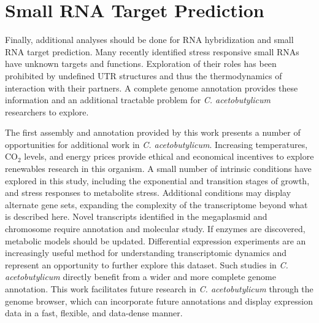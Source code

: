 \section{Small RNA Target Prediction}
Finally, additional analyses should be done for RNA hybridization and small RNA target prediction. Many recently identified stress responsive small RNAs\cite{39} have unknown targets and functions. Exploration of their roles has been prohibited by undefined UTR structures and thus the thermodynamics of interaction with their partners. A complete genome annotation provides these information and an additional tractable problem for \textit{C. acetobutylicum} researchers to explore.

The first assembly and annotation provided by this work presents a number of opportunities for additional work in \textit{C. acetobutylicum}. Increasing temperatures, CO$_{2}$ levels, and energy prices provide ethical and economical incentives to explore renewables research in this organism. A small number of intrinsic conditions have explored in this study, including the exponential and transition stages of growth, and stress responses to metabolite stress. Additional conditions may display alternate gene sets, expanding the complexity of the transcriptome beyond what is described here. Novel transcripts identified in the megaplasmid and chromosome require annotation and molecular study. If enzymes are discovered, metabolic models should be updated. Differential expression experiments are an increasingly useful method for understanding transcriptomic dynamics and represent an opportunity to further explore this dataset. Such studies in \textit{C. acetobutylicum} directly benefit from a wider and more complete genome annotation. This work facilitates future research in \textit{C. acetobutylicum} through the genome browser, which can incorporate future annotations and display expression data in a fast, flexible, and data-dense manner.




